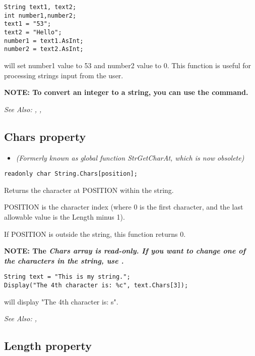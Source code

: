 \begin{verbatim}
String text1, text2;
int number1,number2;
text1 = "53";
text2 = "Hello";
number1 = text1.AsInt;
number2 = text2.AsInt;
\end{verbatim}
will set number1 value to 53 and number2 value to 0.
This function is useful for processing strings input from the user.

\bf{NOTE:} To convert an integer to a string, you can use the 
command.

\it{See Also:} , ,


\subsection{Chars property}\label{String.Chars}%

\begin{itemize}
\item \it{(Formerly known as global function StrGetCharAt, which is now obsolete)}
\end{itemize}

\begin{verbatim}
readonly char String.Chars[position];
\end{verbatim}
Returns the character at POSITION within the string.

POSITION is the character index (where 0 is the first character, and the last
allowable value is the Length minus 1).

If POSITION is outside the string, this function returns 0.

\bf{NOTE:} The \it{Chars} array is read-only. If you want to change one of the characters
in the string, use .

\begin{verbatim}
String text = "This is my string.";
Display("The 4th character is: %c", text.Chars[3]);
\end{verbatim}
will display "The 4th character is: s".

\it{See Also:} ,


\subsection{Length property}\label{String.Length}%

